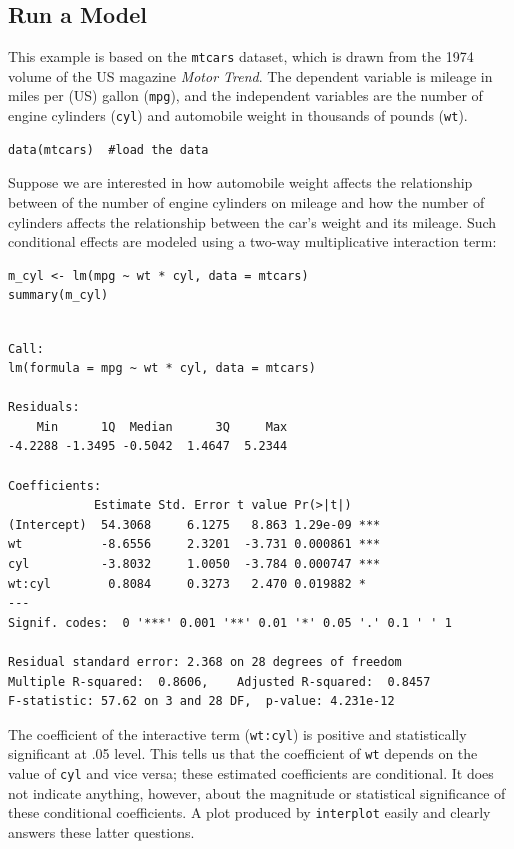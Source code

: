 \documentclass[
  article]{jss}
\begin{document}
\hypertarget{sec-run-a-model}{%
\subsection{Run a Model}\label{sec-run-a-model}}

This example is based on the \texttt{mtcars} dataset, which is drawn
from the 1974 volume of the US magazine \emph{Motor Trend}. The
dependent variable is mileage in miles per (US) gallon (\texttt{mpg}),
and the independent variables are the number of engine cylinders
(\texttt{cyl}) and automobile weight in thousands of pounds
(\texttt{wt}).

\begin{verbatim}
data(mtcars)  #load the data
\end{verbatim}

Suppose we are interested in how automobile weight affects the
relationship between of the number of engine cylinders on mileage and
how the number of cylinders affects the relationship between the car's
weight and its mileage. Such conditional effects are modeled using a
two-way multiplicative interaction term:

\begin{verbatim}
m_cyl <- lm(mpg ~ wt * cyl, data = mtcars)
summary(m_cyl)
\end{verbatim}

\begin{verbatim}

Call:
lm(formula = mpg ~ wt * cyl, data = mtcars)

Residuals:
    Min      1Q  Median      3Q     Max 
-4.2288 -1.3495 -0.5042  1.4647  5.2344 

Coefficients:
            Estimate Std. Error t value Pr(>|t|)    
(Intercept)  54.3068     6.1275   8.863 1.29e-09 ***
wt           -8.6556     2.3201  -3.731 0.000861 ***
cyl          -3.8032     1.0050  -3.784 0.000747 ***
wt:cyl        0.8084     0.3273   2.470 0.019882 *  
---
Signif. codes:  0 '***' 0.001 '**' 0.01 '*' 0.05 '.' 0.1 ' ' 1

Residual standard error: 2.368 on 28 degrees of freedom
Multiple R-squared:  0.8606,    Adjusted R-squared:  0.8457 
F-statistic: 57.62 on 3 and 28 DF,  p-value: 4.231e-12
\end{verbatim}

The coefficient of the interactive term (\texttt{wt:cyl}) is positive
and statistically significant at .05 level. This tells us that the
coefficient of \texttt{wt} depends on the value of \texttt{cyl} and vice
versa; these estimated coefficients are conditional. It does not
indicate anything, however, about the magnitude or statistical
significance of these conditional coefficients. A plot produced by
\texttt{interplot} easily and clearly answers these latter questions.
\end{document}
